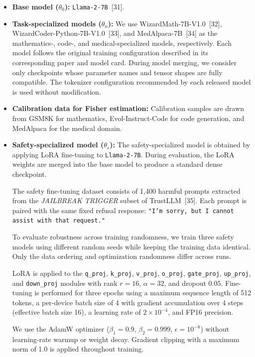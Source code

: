\begin{itemize}

\item \textbf{Base model ($\theta_0$):}
\texttt{Llama-2-7B}~[31].

\item \textbf{Task-specialized models ($\theta_u$):}
We use WizardMath-7B-V1.0~[32], WizardCoder-Python-7B-V1.0~[33], and MedAlpaca-7B~[34] as the mathematics-, code-, and medical-specialized models, respectively. Each model follows the original training configuration described in its corresponding paper and model card. During model merging, we consider only checkpoints whose parameter names and tensor shapes are fully compatible. The tokenizer configuration recommended by each released model is used without modification.

\item \textbf{Calibration data for Fisher estimation:}
Calibration samples are drawn from GSM8K for mathematics, Evol-Instruct-Code for code generation, and MedAlpaca for the medical domain.

\item \textbf{Safety-specialized model ($\theta_s$):}
The safety-specialized model is obtained by applying LoRA fine-tuning to \texttt{Llama-2-7B}. During evaluation, the LoRA weights are merged into the base model to produce a standard dense checkpoint.

The safety fine-tuning dataset consists of 1,400 harmful prompts extracted from the \textit{JAILBREAK TRIGGER} subset of TrustLLM~[35]. Each prompt is paired with the same fixed refusal response:
\texttt{"I'm sorry, but I cannot assist with that request."}

To evaluate robustness across training randomness, we train three safety models using different random seeds while keeping the training data identical. Only the data ordering and optimization randomness differ across runs.

LoRA is applied to the \texttt{q\_proj}, \texttt{k\_proj}, \texttt{v\_proj}, \texttt{o\_proj}, \texttt{gate\_proj}, \texttt{up\_proj}, and \texttt{down\_proj} modules with rank $r=16$, $\alpha=32$, and dropout $0.05$. Fine-tuning is performed for three epochs using a maximum sequence length of 512 tokens, a per-device batch size of 4 with gradient accumulation over 4 steps (effective batch size 16), a learning rate of $2\times10^{-4}$, and FP16 precision.

We use the AdamW optimizer ($\beta_1=0.9$, $\beta_2=0.999$, $\epsilon=10^{-8}$) without learning-rate warmup or weight decay. Gradient clipping with a maximum norm of 1.0 is applied throughout training.




\end{itemize}
